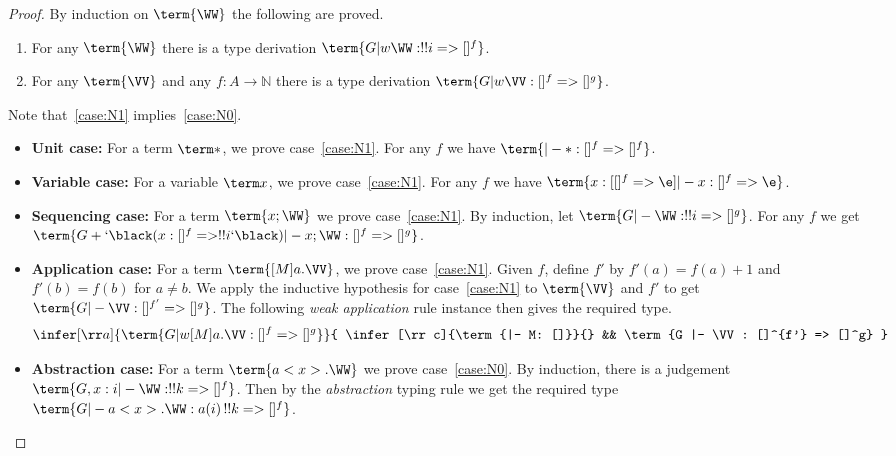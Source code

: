 \documentclass[a4paper,UKenglish,cleveref, autoref, thm-restate]{lipics-v2021}
\newcommand\case[1]{\textbf{#1}}
\begin{document}
\begin{proof}
By induction on $\term{\WW}$ the following are proved.
\begin{enumerate}
	\item\label{case:N0} For any $\term{\WW}$ there is a type derivation $\term{G |w \WW: !!i => []^f}$.
	\item\label{case:N1} For any $\term{\VV}$ and any $f:A\to\mathbb N$ there is a type derivation $\term{G |w \VV: []^f => []^g}$.
\end{enumerate}
Note that~\ref{case:N1} implies~\ref{case:N0}.

\begin{itemize}

\item\case{Unit case:}
For a term $\term *$, we prove case~\ref{case:N1}. For any $f$ we have $\term{|- *:[]^f => []^f}$.

\item\case{Variable case:}
For a variable $\term x$, we prove case~\ref{case:N1}. For any $f$ we have $\term{x:[[]^f=>\e] |- x: []^f => \e}$.

\item\case{Sequencing case:}
For a term $\term{x;\WW}$ we prove case~\ref{case:N1}. By induction, let $\term{G |- \WW: !!i => []^g}$. For any $f$ we get $\term{G + `{\black(}x:[]^f=>!!i`{\black)} |- x;\WW : []^f => []^g}$.

\item\case{Application case:}
For a term $\term{[M]a.\VV}$, we prove case~\ref{case:N1}. Given $f$, define $f'$ by $f'(a)=f(a)+1$ and $f'(b)=f(b)$ for $a\neq b$. We apply the inductive hypothesis for case~\ref{case:N1} to $\term{\VV}$ and $f'$ to get $\term{G |- \VV: []^{f'} => []^g}$. The following \emph{weak application} rule instance then gives the required type.
\[
\infer[\rr a]{\term{G |w [M]a.\VV : []^f => []^g}}{
   \infer[\rr c]{\term{|- M: []}}{}
&& \term{G |- \VV: []^{f'} => []^g}
}
\]

\item\case{Abstraction case:}
For a term $\term{a<x>.\WW}$ we prove case~\ref{case:N0}. By induction, there is a judgement $\term{G , x:i |- \WW : !!k => []^f}$. Then by the \emph{abstraction} typing rule we get the required type $\term{G |- a<x>.\WW : a(i)\,!!k => []^f}$.
\qedhere
\end{itemize}
\end{proof}


\weightedSpine*
\end{document}
